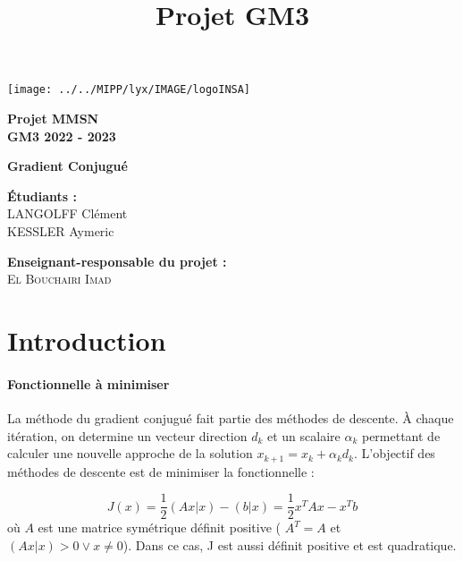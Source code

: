 \documentclass[french]{article}
\title{Projet GM3}
\newcommand{\noun}[1]{\textsc{#1}}
\begin{document}
\thispagestyle{empty}

\begin{minipage}[c]{0.4\textwidth}%
\texttt{[image: ../../MIPP/lyx/IMAGE/logoINSA]}%
\end{minipage}\hfill{}%
\begin{minipage}[c]{0.4\textwidth}%
\centering \textcolor{INSA_GM}{\textbf{\Large{}Projet MMSN }\\
\textbf{\Large{}GM3 2022 - 2023}}%
\end{minipage}\vspace{7cm}

\noindent\begin{minipage}[c]{1\textwidth}%
\centering\textcolor{INSA_BLEU}{\textbf{\Huge{}Gradient Conjugué
}}%
\end{minipage}\vfill{}
\vfill{}

\begin{minipage}[t]{6cm}%
\large \textcolor{INSA_GRIS}{ \textbf{Étudiants :} \\
LANGOLFF Clément\\
KESSLER Aymeric}%
\end{minipage}\hfill{}%
\begin{minipage}[t]{9cm}%
\large \textcolor{INSA_GRIS}{\textbf{Enseignant-responsable du projet
:}\\
 \noun{El Bouchairi Imad} }%
\end{minipage}\vspace{2cm}

\newpage{}

\tableofcontents{}

\newpage{}

\part{Introduction}

\subsection{Fonctionnelle à minimiser}

La méthode du gradient conjugué fait partie des méthodes de descente.
À chaque itération, on determine un vecteur direction $d_{k}$ et
un scalaire $\alpha_{k}$ permettant de calculer une nouvelle approche
de la solution $x_{k+1}=x_{k}+\alpha_{k}d_{k}$. L'objectif des méthodes
de descente est de minimiser la fonctionnelle\nocite{Lascaux2004-gj}
:

\begin{equation}
J(x)=\frac{1}{2}(Ax|x)-(b|x)=\frac{1}{2}x^{T}Ax-x^{T}b
\end{equation}
 où $A$ est une matrice symétrique définit positive ( $A^{T}=A$
et $(Ax|x)>0\lor x\neq0$). Dans ce cas, J est aussi définit positive
et est quadratique. 
\end{document}
